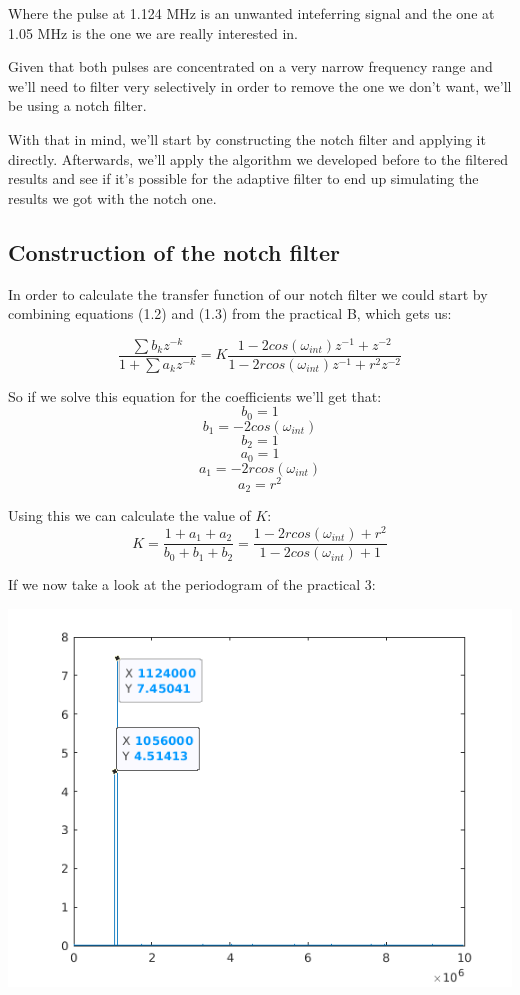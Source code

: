 \documentclass[conference,9pt]{IEEEtran}
\begin{document}
Where the pulse at 1.124 MHz is an unwanted inteferring signal and the one at 1.05 MHz is the one we are really interested in.

Given that both pulses are concentrated on a very narrow frequency range and we'll need to filter very selectively in order to remove the one we don't want, we'll be using a notch filter.

With that in mind, we'll start by constructing the notch filter and applying it directly. Afterwards, we'll apply the algorithm we developed before to the filtered results and see if it's possible for the adaptive filter to end up simulating the results we got with the notch one.

\subsection{Construction of the notch filter}
In order to calculate the transfer function of our notch filter we could start by combining equations (1.2) and (1.3) from the practical B, which gets us:

$$\frac{\sum b_k z^{-k}}{1 + \sum a_k z^{-k}} = K\frac{1-2cos(\omega_{int})z^{-1} + z^{-2}}{1- 2rcos(\omega_{int})z^{-1}+r^2z^{-2}}$$

So if we solve this equation for the coefficients we'll get that:
$$b_0=1$$
$$b_1=-2cos(\omega_{int})$$
$$b_2=1$$
$$a_0=1$$
$$a_1=-2rcos(\omega_{int})$$
$$a_2=r^2$$

Using this we can calculate the value of $K$:
$$K=\frac{1 + a_1+a_2}{b_0+b_1+b_2}=\frac{1-2rcos(\omega_{int})+r^2}{1-2cos(\omega_{int})+1}$$

If we now take a look at the periodogram of the practical 3:

\includegraphics[scale=0.6]{perio.png}
\end{document}
